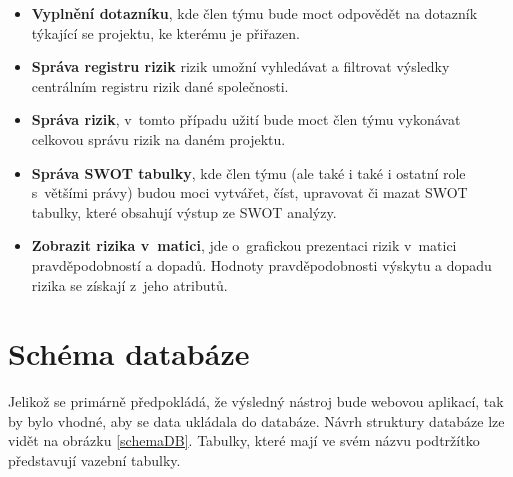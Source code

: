 \begin{itemize}
    \item \textbf{Vyplnění dotazníku}, kde člen týmu bude moct odpovědět na dotazník týkající se projektu, ke kterému je přiřazen.
    \item \textbf{Správa registru rizik} rizik umožní vyhledávat a filtrovat výsledky centrálním registru rizik dané společnosti.
    \item \textbf{Správa rizik}, v~tomto případu užití bude moct člen týmu vykonávat celkovou správu rizik na daném projektu.
    \item \textbf{Správa SWOT tabulky}, kde člen týmu (ale také i také i ostatní role s~většími právy) budou moci vytvářet, číst, upravovat či mazat SWOT tabulky, které obsahují výstup ze SWOT analýzy.
    \item \textbf{Zobrazit rizika v~matici}, jde o~grafickou prezentaci rizik v~matici pravděpodobností a dopadů. Hodnoty pravděpodobnosti výskytu a dopadu rizika se získají z~jeho atributů.
\end{itemize}

\section{Schéma databáze}
\label{databaze}

Jelikož se primárně předpokládá, že výsledný nástroj bude webovou aplikací, tak by bylo vhodné, aby se data ukládala do databáze. Návrh struktury databáze lze vidět na obrázku \ref{schemaDB}. Tabulky, které mají ve svém názvu podtržítko představují vazební tabulky.

